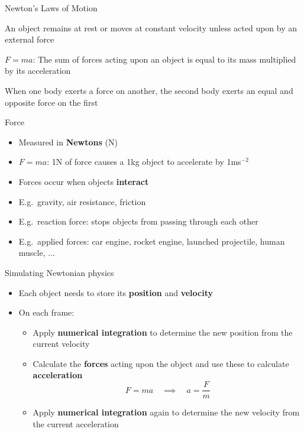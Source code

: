 \begin{frame}{Newton's Laws of Motion}
	\begin{center}
		\pause An object remains at rest or moves at constant velocity unless acted upon by an external force
		
		\vspace{2ex}
		
		\pause $F = ma$: The sum of forces acting upon an object is equal to its mass multiplied by its acceleration
		
		\vspace{2ex}
		
		\pause When one body exerts a force on another, the second body exerts an equal and opposite force on the first
	\end{center}
\end{frame}

\begin{frame}{Force}
	\begin{itemize}
		\pause\item Measured in \textbf{Newtons} (N)
		\pause\item $F = ma$: 1N of force causes a 1kg object to accelerate by 1ms$^{-2}$
		\pause\item Forces occur when objects \textbf{interact}
		\pause\item E.g.\ gravity, air resistance, friction
		\pause\item E.g.\ reaction force: stops objects from passing through each other
		\pause\item E.g.\ applied forces: car engine, rocket engine, launched projectile, human muscle, ...
	\end{itemize}
\end{frame}

\begin{frame}{Simulating Newtonian physics}
	\begin{itemize}
		\pause\item Each object needs to store its \textbf{position} and \textbf{velocity}
		\pause\item On each frame:
			\begin{itemize}
				\pause\item Apply \textbf{numerical integration} to determine the new position from the current velocity
				\pause\item Calculate the \textbf{forces} acting upon the object and use these to calculate \textbf{acceleration}
					$$ F = ma \quad \implies \quad a = \frac{F}{m} $$
				\pause\item Apply \textbf{numerical integration} again to determine the new velocity from the current acceleration
			\end{itemize}
	\end{itemize}
\end{frame}

